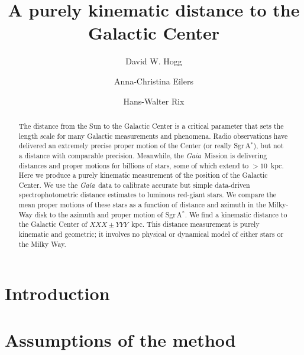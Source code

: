 \documentclass[modern]{aastex62}
\newcommand{\project}[1]{\textsl{#1}}
\newcommand{\gaia}{\project{Gaia}}
\newcommand{\sagastar}{Sgr\,A$^{\ast}$}
\begin{document}
\sloppy\sloppypar\raggedbottom\frenchspacing %

\title{\textbf{%
A purely kinematic distance to the Galactic Center
}}

\author[0000-0003-2866-9403]{David W. Hogg}

\author[0000-0003-2895-6218]{Anna-Christina Eilers}

\author[0000-0003-4996-9069]{Hans-Walter Rix}

\begin{abstract}\noindent
The distance from the Sun to the Galactic Center is a critical parameter
that sets the length scale for many Galactic measurements and phenomena.
Radio observations have delivered an extremely precise proper motion
of the Center (or really \sagastar),
but not a distance with comparable precision.
Meanwhile, the \gaia\ Mission is delivering distances and proper motions for
billions of stars, some of which extend to $>10$~kpc.
Here we produce a purely kinematic measurement of the position of the
Galactic Center.
We use the \gaia\ data to calibrate accurate but simple data-driven
spectrophotometric distance estimates to luminous red-giant stars.
We compare the mean proper motions of these stars as a function of distance
and azimuth in the Milky-Way disk to the azimuth and proper motion of
\sagastar.
We find a kinematic distance to the Galactic Center of $XXX\pm YYY$~kpc.
This distance measurement is purely kinematic and geometric;
it involves no physical or dynamical model of either stars or the Milky Way.
\end{abstract}


\section{Introduction} \label{sec:intro}

\section{Assumptions of the method}
\end{document}
